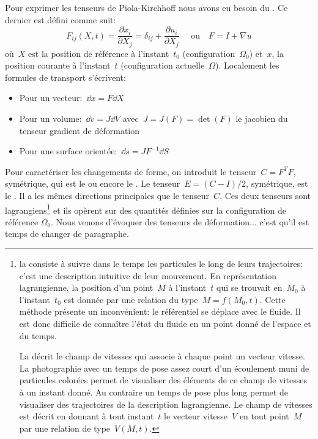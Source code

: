 \medskipvm
Pour exprimer les tenseurs de Piola-Kirchhoff
nous avons eu besoin du . Ce dernier est défini comme suit:
\begin{equation} F_{ij}(X,t) = \dfrac{\partial x_i}{\partial X_j} = \delta_{ij} + \frac{\partial u_i}{\partial X_j}
\quad \text{ ou} \quad F = I + \nabla u\end{equation}
où~$X$ est la position de référence à l'instant~$t_0$ (configuration~$\Omega_0$) et~$x$, la position
courante à l'instant~$t$ (configuration actuelle~$\Omega$).
\medskipvm
Localement les formules de transport s'écrivent:
\begin{itemize}
  \item Pour un vecteur:~$\dd x = F \dd X$
  \item Pour un volume:~$\dd v = J \dd V$ avec~$J= J(F) = \det(F)$ le jacobien du tenseur gradient de déformation
  \item Pour une surface orientée:~$\dd s = J F^{-1} \dd S$
\end{itemize}
\medskipvm
Pour caractériser les changements de forme, on introduit le tenseur~$C = F^TF$, symétrique, qui est le
 ou encore le .
\medskipvm
Le tenseur~$E = (C-I)/2$, symétrique, est le .
Il a les mêmes directions principales que le tenseur~$C$.
\medskipvm
Ces deux tenseurs sont lagrangiens\footnote{la  consiste à suivre dans le temps les particules le long de leurs trajectoires: c'est une description intuitive de leur mouvement.
En représentation lagrangienne, la position d'un point~$M$ à l'instant~$t$ qui se trouvait en~$M_0$ à
l'instant~$t_0$ est donnée par une relation du type~$M = f(M_0,t)$.
Cette méthode présente un inconvénient: le référentiel se déplace avec le fluide.
Il est donc difficile de connaître l'état du fluide en un point donné de l'espace et du temps.

\medskip
La  décrit le champ de vitesses qui associe à chaque point un
vecteur vitesse.
La photographie avec un temps de pose assez court d'un écoulement muni de particules colorées permet
de visualiser des éléments de ce champ de vitesses à un instant donné.
Au contraire un temps de pose plus long permet de visualiser des trajectoires de la description lagrangienne.
Le champ de vitesses est décrit en donnant à tout instant~$t$ le vecteur vitesse~$V$ en tout point~$M$
par une relation de type~$V(M,t)$.
} et ils opèrent sur des quantités définies sur la configuration de référence
$\Omega_0$.
\medskipvm
Nous venons d'évoquer des tenseurs de déformation... c'est qu'il est temps de changer de
paragraphe.


